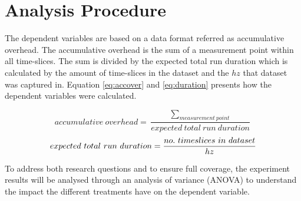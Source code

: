 	

\section{Analysis Procedure}
The dependent variables are based on a data format referred as accumulative overhead. The accumulative overhead is the sum of a measurement point within all time-slices. The sum is divided by the expected total run duration which is calculated by the amount of time-slices in the dataset and the $hz$ that dataset was captured in. Equation \ref{eq:accover} and \ref{eq:duration} presents how the dependent variables were calculated.

\begin{figure}[H]
\begin{equation}\label{eq:accover}
accumulative\ overhead = \frac{\sum_{measurement\ point}}{expected\ total\ run\ duration}
\end{equation}
\begin{equation}\label{eq:duration}
expected\ total\ run\ duration = \frac{no.\ time\-slices\ in\ dataset}{hz}
\end{equation}
\end{figure}

To address both research questions and to ensure full coverage, the experiment results will be analysed through an analysis of variance (ANOVA) to understand the impact the different treatments have on the dependent variable.\\









